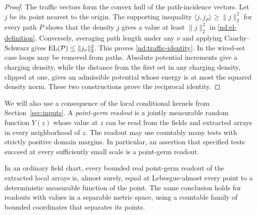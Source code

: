 \begin{proof}
The traffic vectors form the convex hull of the path-incidence
vectors.  Let $j$ be its point nearest to the origin.  The supporting
inequality $\langle j,j_P\rangle\ge\|j\|_2^2$ for every path $P$
shows that the density $j$ gives a value at least $\|j\|_2^2$ in
\eqref{nd:el-definition}.  Conversely, averaging path length under
any $\nu$ and applying Cauchy--Schwarz gives
$\operatorname{EL}(\mathcal P)\le\|j_\nu\|_2^2$.  This proves
\eqref{nd:traffic-identity}.  In the wired-set case loops may be
removed from paths.  Absolute potential increments give a charging
density, while the distance from the first set in any charging
density, clipped at one, gives an admissible potential whose energy
is at most the squared density norm.  These two constructions prove
the reciprocal identity.
\end{proof}

We will also use a consequence of the local conditional kernels from
Section~\ref{sec:inputs}.  A \emph{point-germ readout} is a jointly
measurable random function $Y(z)$ whose value at $z$ can be read from
the fields and extracted arrays in every neighborhood of $z$.  The
readout may use countably many tests with strictly positive domain
margins.  In particular, an assertion that specified tests succeed
at every sufficiently small scale is a point-germ readout.

\begin{lemma}\label{nd:germs}
In an ordinary field chart, every bounded real point-germ readout
of the extracted local arrays is, almost surely, equal at
Lebesgue-almost every point to a deterministic measurable function
of the point.  The same conclusion holds for readouts with values
in a separable metric space, using a countable family of bounded
coordinates that separates its points.
\end{lemma}


